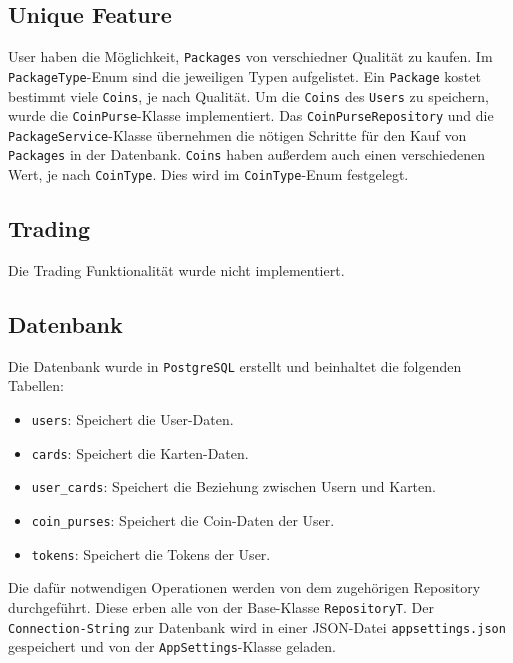 \documentclass[a4paper, 12pt]{article}
\begin{document}
\subsection{Unique Feature}
User haben die Möglichkeit, \texttt{Packages} von verschiedner Qualität zu kaufen. Im \texttt{PackageType}-Enum sind die jeweiligen Typen aufgelistet. Ein \texttt{Package} kostet bestimmt viele \texttt{Coins}, je nach Qualität.
Um die \texttt{Coins} des \texttt{Users} zu speichern, wurde die \texttt{CoinPurse}-Klasse implementiert. Das \texttt{CoinPurseRepository} und die \texttt{PackageService}-Klasse übernehmen die nötigen Schritte für den Kauf von \texttt{Packages} in der Datenbank.
\texttt{Coins} haben außerdem auch einen verschiedenen Wert, je nach \texttt{CoinType}. Dies wird im \texttt{CoinType}-Enum festgelegt.

\subsection{Trading}
Die Trading Funktionalität wurde nicht implementiert.

\subsection{Datenbank}
Die Datenbank wurde in \texttt{PostgreSQL} erstellt und beinhaltet die folgenden Tabellen:
\begin{itemize}
    \item \texttt{users}: Speichert die User-Daten.
    \item \texttt{cards}: Speichert die Karten-Daten.
    \item \texttt{user\_cards}: Speichert die Beziehung zwischen Usern und Karten.
    \item \texttt{coin\_purses}: Speichert die Coin-Daten der User.
    \item \texttt{tokens}: Speichert die Tokens der User.
\end{itemize}
Die dafür notwendigen Operationen werden von dem zugehörigen Repository durchgeführt. Diese erben alle von der Base-Klasse \texttt{RepositoryT}.
Der \texttt{Connection-String} zur Datenbank wird in einer JSON-Datei \texttt{appsettings.json} gespeichert und von der \texttt{AppSettings}-Klasse geladen.
\end{document}
